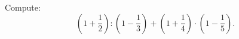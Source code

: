 Compute: \[\left(1+\dfrac{1}{2}\right):\left(1-\dfrac{1}{3}\right)+\left(1+\dfrac{1}{4}\right)\cdot\left(1-\dfrac{1}{5}\right).\]

